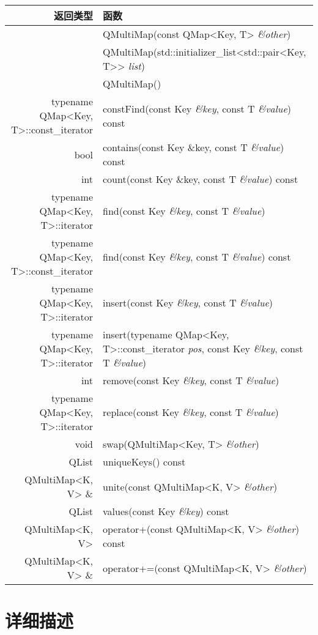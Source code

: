 \begin{longtable}{|r|m{28em}|}   
    \hline
    返回类型 	& 函数 \\
    \hline
    &QMultiMap(const QMap<Key, T> \emph{\&other}) \\
    \hline 
	&QMultiMap(std::initializer\_list<std::pair<Key, T>> \emph{list})\\
    \hline
	&QMultiMap() \\
    \hline
typename QMap<Key, T>::const\_iterator &	constFind(const Key \emph{\&key}, const T \emph{\&value}) const \\
\hline
bool 	& contains(const Key \&key, const T \emph{\&value}) const\\
\hline
int 	& count(const Key \&key, const T \emph{\&value}) const\\
\hline
typename QMap<Key, T>::iterator 	& find(const Key \emph{\&key}, const T \emph{\&value})\\
\hline
typename QMap<Key, T>::const\_iterator &	find(const Key \emph{\&key}, const T \emph{\&value}) const\\
\hline
typename QMap<Key, T>::iterator &insert(const Key \emph{\&key}, const T \emph{\&value})\\
\hline
typename QMap<Key, T>::iterator & insert(typename QMap<Key, T>::const\_iterator \emph{pos}, const Key \emph{\&key}, const T \emph{\&value}) \\
\hline
int &	remove(const Key \emph{\&key}, const T \emph{\&value}) \\
\hline
typename QMap<Key, T>::iterator &	replace(const Key \emph{\&key}, const T \emph{\&value}) \\
\hline
void 	&swap(QMultiMap<Key, T> \emph{\&other})\\
\hline
QList &	uniqueKeys() const \\
\hline
QMultiMap<K, V> \& &	unite(const QMultiMap<K, V> \emph{\&other}) \\
\hline
QList &	values(const Key \emph{\&key}) const \\
\hline
QMultiMap<K, V> 	&operator+(const QMultiMap<K, V> \emph{\&other}) const \\
\hline
QMultiMap<K, V> \& &	operator+=(const QMultiMap<K, V> \emph{\&other}) \\
    \hline
\end{longtable}


\section{详细描述}

